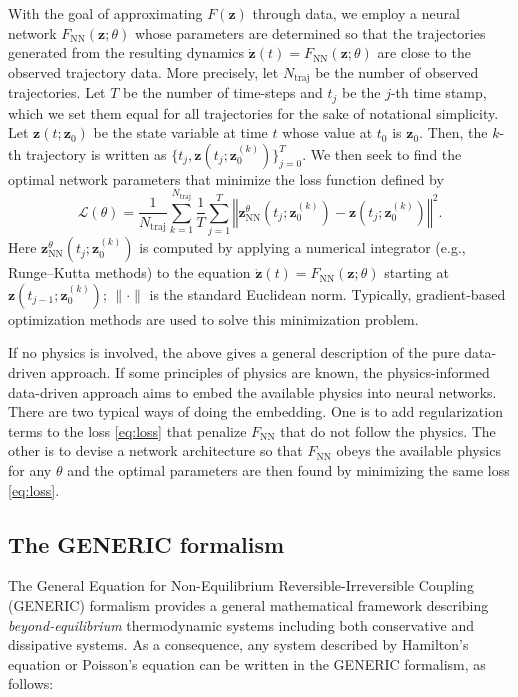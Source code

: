 \documentclass[openacc]{rsproca_new}%
\newcommand{\z}{\bm{z}}
\begin{document}
With the goal of approximating $F(\z)$ through data,
we employ a neural network $F_{\text{NN}}(\z;\theta)$ 
whose parameters are determined so that 
the trajectories generated from the resulting dynamics $\dot{\z}(t) = F_{\text{NN}}(\z;\theta)$
are close to the observed trajectory data.
More precisely, let $N_{\text{traj}}$ be the number of observed trajectories.
Let $T$ be the number of time-steps 
and $t_j$ be the $j$-th time stamp,
which we set them equal for all trajectories for the sake of notational simplicity.
Let $\z(t;\z_0)$ be the state variable at time $t$ whose value at $t_0$ is $\z_0$.
Then, the $k$-th trajectory is written as $\{t_j, \z(t_j;\z_0^{(k)})\}_{j=0}^{T}$.
We then seek to find the optimal network parameters 
that minimize the loss function defined by
\begin{equation}\label{eq:loss}
    \mathcal{L}(\theta) = \frac{1}{N_{\text{traj}}} \sum_{k=1}^{N_{\text{traj}}} \frac{1}{T} \sum_{j=1}^{T} 
    \left\Vert\z_{\text{NN}}^{\theta}(t_j;\z_0^{(k)}) - \z(t_j;\z_0^{(k)}) \right\Vert^2.
\end{equation}
Here $\z_{\text{NN}}^{\theta}(t_j;\z_0^{(k)})$ is computed by applying
a numerical integrator \cite{lambert1991numerical} (e.g., Runge–Kutta methods) to the equation $\dot{\z}(t) = F_{\text{NN}}(\z;\theta)$
starting at $\z(t_{j-1};\z_0^{(k)})$;
$\|\cdot\|$ is the standard Euclidean norm.
Typically, gradient-based optimization methods are used
to solve this minimization problem. 


If no physics is involved, 
the above gives a general description of the pure data-driven approach.
If some principles of physics are known, 
the physics-informed data-driven approach
aims to embed the available physics into neural networks.
There are two typical ways of doing the embedding. 
One is to add regularization terms to the loss \eqref{eq:loss} that penalize $F_{\text{NN}}$
that do not follow the physics.
The other is to devise a network architecture so that $F_{\text{NN}}$ obeys 
the available physics for any $\theta$ and the optimal parameters are then found by
minimizing the same loss \eqref{eq:loss}. 



\subsection{The GENERIC formalism}
The General Equation for Non-Equilibrium Reversible-Irreversible Coupling (GENERIC) formalism
provides a general mathematical framework 
describing \textit{beyond-equilibrium} thermodynamic systems
\cite{ottinger2005beyond} including both conservative and dissipative systems. 
As a consequence, any system described by Hamilton's equation or Poisson's 
equation can be written in the GENERIC formalism, as follows: 
\end{document}
